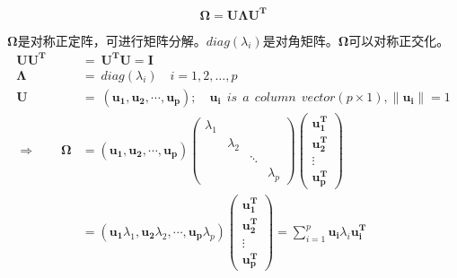   \begin{mydef}[方差矩阵]
    \[ \boldsymbol{\Omega  = U \Lambda U^{T} } \]

    $ \boldsymbol{\Omega} $是对称正定阵，可进行矩阵分解。$ diag(\lambda_{i}) $是对角矩阵。$ \boldsymbol{\Omega} $可以对称正交化。
  \begin{align*}
    \boldsymbol{ UU^{T}}  & = ~ \boldsymbol{U^{T} U   = I} \\
    \boldsymbol{\Lambda} & = ~ diag(\lambda_{i} ) \quad i = 1 , 2 ,\ldots ,p\\
    \boldsymbol{U} & = ~ \boldsymbol{( u_1,u_2,\cdots, u_p)}; \quad 
    \boldsymbol{u_i} ~~ is ~~ a  ~~ column ~~ vector (p \times 1),\| \boldsymbol{u_i} \| = 1 \\
    \Longrightarrow \qquad \boldsymbol{\Omega}  & = ( \boldsymbol{u_1,u_2,\cdots, u_p})  
    \begin{pmatrix}
        \lambda_{1} &  &  &  \\
        & \lambda_{2} & & \\
        & &  \ddots & \\\
        &  &  & \lambda_{p}
       \end{pmatrix}   
       \begin{pmatrix}
        \boldsymbol{u_1^{T}} \\
        \boldsymbol{u_2^{T}} \\
        \vdots\\
        \boldsymbol{u_p^{T}}
    \end{pmatrix} \\
    & = ( \boldsymbol{u_1} \lambda_{1} ,\boldsymbol{u_2} \lambda_{2} ,\cdots, \boldsymbol{u_p} \lambda_{p} ) 
     \begin{pmatrix}
        \boldsymbol{u_1^{T}} \\
        \boldsymbol{u_2^{T}} \\
        \vdots\\
        \boldsymbol{u_p^{T}}
     \end{pmatrix}  = \sum_{i = 1}^{p} \boldsymbol{u_{i}} \lambda_{i} \boldsymbol{u_{i}^{T}}
  \end{align*}
\end{mydef}
